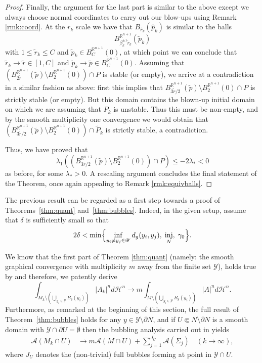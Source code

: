 \documentclass[JEP,XML,SOM,Unicode]{cedram}
\let\mathcal\mathscr
\DeclareMathOperator{\inj}{inj}
\theoremstyle{definition}
\newcommand{\R}{\mathbb{R}}
\newcommand{\h}{\mathscr{H}}
\let\cemb\Subset
\begin{document}
\begin{proof}
Finally, the argument for the last part is similar to the above except we always choose normal coordinates to carry out our blow-ups using Remark \ref{rmk:coord}. At the $r_k$ scale we have that $B_{\widehat{r}_k}(\widehat{p}_k)$ is similar to the balls
$$B^{\R^{n+1}}_{\beta_k^{\pm 1}\widetilde{r}_k}(\widetilde{p}_k)$$ with $1\leq \widetilde{r}_k \leq C$ and $\widetilde{p}_k\in B^{\R^{n+1}}_C(0)$, at which point we can conclude that $\widetilde{r}_k \to \widetilde{r}\in [1,C]$ and $\widetilde{p}_k \to \widetilde{p}\in B^{\R^{n+1}}_C(0)$.
Assuming that $(B^{\R^{n+1}}_{2\widetilde{r}}(\widetilde{p})\setminus B^{\R^{n+1}}_2(0))\cap P$ is stable (or empty), we arrive at a contradiction in a similar fashion as above: first this implies that $B_{3\widetilde{r}/2}^{\R^{n+1}}(\widetilde{p})\setminus B_2^{\R^{n+1}}(0)\cap P$ is strictly stable (or empty). But this domain contains the blown-up initial domain on which we are assuming that $P_k$ is unstable. Thus this must be non-empty, and by the smooth multiplicity one convergence we would obtain that $(B_{3\widetilde{r}/2}^{\R^{n+1}}(\widetilde{p})\setminus B_2^{\R^{n+1}}(0))\cap \widetilde{P}_k$ is strictly stable, a contradiction.

Thus, we have proved that $$\lambda_1 ((B^{\R^{n+1}}_{3\widetilde{r}/2}(\widetilde{p})\setminus B^{\R^{n+1}}_2(0))\cap P)\leq -2\lambda_{\ast}<0 $$ as before, for some $\lambda_{\ast}>0$. A rescaling argument concludes the final statement of the Theorem, once again appealing to Remark \ref{rmk:equivballs}.
\end{proof}

The previous result can be regarded as a first step towards a proof of Theorems~\ref{thm:quant} and~\ref{thm:bubbles}. Indeed, in the given setup, assume that $\delta$ is sufficiently small so that
\begin{equation*}
2\delta<\min\Bigl\{\inf_{ y_i\neq y_j\in \mathcal{Y}} d_g(y_i,y_j),\; \inj_N,\;\gamma_0 \Bigr\}.
\end{equation*}

We know that the first part of Theorem \ref{thm:quant} (namely: the smooth graphical convergence with multiplicity $m$ away from the finite set $\mathcal{Y}$), holds true by \cite{ACS17} and therefore, we patently derive
\begin{equation*}
\int_{M_k\setminus \left(\bigcup_{y_i \in \mathcal{Y}} B_{\delta}(y_i)\right)} |A_k|^n d \h^n \to m \int_{M\setminus \left(\bigcup_{y_i \in \mathcal{Y}} B_{\delta}(y_i)\right)} |A|^n d \h^n.
\end{equation*}
Furthermore, as remarked at the beginning of this section, the full result of Theorem~\ref{thm:bubbles} holds for any $y\in \mathcal{Y}\setminus\partial N$, and if $U\cemb N\setminus \partial N$ is a smooth domain with $\mathcal{Y}\cap \partial U=\emptyset$ then the bubbling analysis carried out in \cite{BS17} yields
\begin{align*}
\mathcal{A}(M_k\cap U) &\to m\mathcal{A}(M\cap U) + \sum_{j=1}^{J_U} \mathcal{A}(\Sigma_j) \quad (k\to\infty),
\end{align*}
where $J_U$ denotes the (non-trivial) full bubbles forming at point in $\mathcal{Y}\cap U$.
\end{document}
